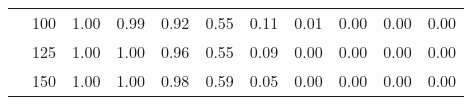 \begin{table}[t]
\begin{center}
\begin{subtable}[c]{\textwidth}
\begin{center}
\begin{tabular}{rcccccccccc}
                                        & \multicolumn{1}{c|}{100}  & \num{1.00}  & \num{0.99}  & \num{0.92}  & \num{0.55}  & \num{0.11}  & \num{0.01}  & \num{0.00}  & \num{0.00}  & \num{0.00}  \\
                                        & \multicolumn{1}{c|}{125}  & \num{1.00}  & \num{1.00}  & \num{0.96}  & \num{0.55}  & \num{0.09}  & \num{0.00}  & \num{0.00}  & \num{0.00}  & \num{0.00}  \\
                                        & \multicolumn{1}{c|}{150}  & \num{1.00}  & \num{1.00}  & \num{0.98}  & \num{0.59}  & \num{0.05}  & \num{0.00}  & \num{0.00}  & \num{0.00}  & \num{0.00}  \\
                                    \end{tabular}
            \end{center}
        \end{subtable}

        \vspace{5mm}


\end{center}
\end{table}
